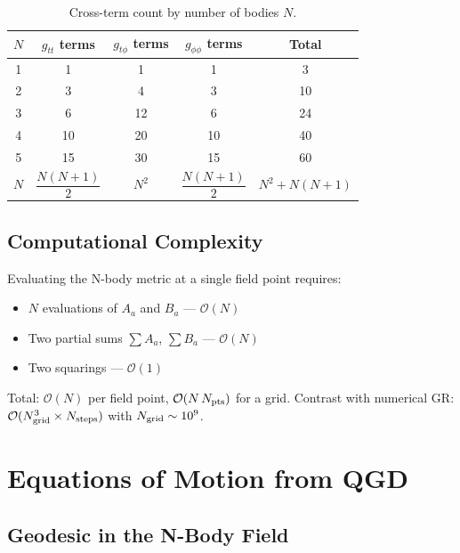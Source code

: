 \documentclass[11pt,a4paper]{article}
\theoremstyle{definition}
\theoremstyle{remark}
\begin{document}
	\begin{table}[h]
		\centering
		\caption{Cross-term count by number of bodies $N$.}
		\label{tab:count}
		\begin{tabular}{ccccc}
			\toprule
			$N$ & $g_{tt}$ terms & $g_{t\phi}$ terms & $g_{\phi\phi}$ terms & Total\\
			\midrule
			1   & 1         & 1         & 1         & 3\\
			2   & 3         & 4         & 3         & 10\\
			3   & 6         & 12        & 6         & 24\\
			4   & 10        & 20        & 10        & 40\\
			5   & 15        & 30        & 15        & 60\\
			$N$ & $\dfrac{N(N+1)}{2}$ & $N^2$ & $\dfrac{N(N+1)}{2}$ & $N^2+N(N+1)$\\
			\bottomrule
		\end{tabular}
	\end{table}
	
	\subsection{Computational Complexity}
	
	Evaluating the N-body metric at a single field point requires:
	\begin{itemize}
		\item $N$ evaluations of $A_a$ and $B_a$ — $\mathcal{O}(N)$
		\item Two partial sums $\sum A_a$, $\sum B_a$ — $\mathcal{O}(N)$
		\item Two squarings — $\mathcal{O}(1)$
	\end{itemize}
	
	Total: $\mathcal{O}(N)$ per field point, $\mathcal{O}(N\,N_{\rm pts})$ for
	a grid.  Contrast with numerical GR: $\mathcal{O}(N_{\rm grid}^3\times N_{\rm steps})$
	with $N_{\rm grid}\sim 10^9$.
	
	\section{Equations of Motion from QGD}
	\label{sec:eom}
	
	\subsection{Geodesic in the N-Body Field}
	
\end{document}
